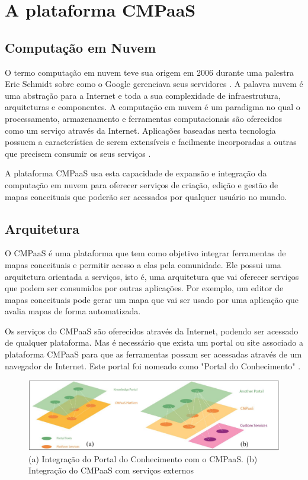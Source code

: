 \documentclass[
	12pt,				%
	openright,			%
	oneside,			%
	a4paper,			%
	english,			%
	french,				%
	spanish,			%
	brazil				%
	]{abntex2}
\begin{document}
\section{A plataforma CMPaaS}

\subsection{Computação em Nuvem}

O termo computação em nuvem teve sua origem em 2006 durante uma palestra Eric Schmidt sobre como o Google gerenciava seus servidores \cite{taurion2009}. A palavra nuvem é uma abstração para a Internet e toda a sua complexidade de infraestrutura, arquiteturas e componentes. A computação em nuvem é um paradigma no qual o processamento, armazenamento e ferramentas computacionais são oferecidos como um serviço através da Internet. Aplicações baseadas nesta tecnologia possuem a característica de serem extensíveis e facilmente incorporadas a outras que precisem consumir os seus serviços \cite{Perin2014}.

A plataforma CMPaaS usa esta capacidade de expansão e integração da computação em nuvem para oferecer serviços de criação, edição e gestão de mapas conceituais que poderão ser acessados por qualquer usuário no mundo.

\subsection{Arquitetura}

O CMPaaS é uma plataforma que tem como objetivo integrar ferramentas de mapas conceituais e permitir acesso a elas pela comunidade. Ele possui uma arquitetura orientada a serviços, isto é, uma arquitetura que vai oferecer serviços que podem ser consumidos por outras aplicações. Por exemplo, um editor de mapas conceituais pode gerar um mapa que vai ser usado por uma aplicação que avalia mapas de forma automatizada.

Os serviços do CMPaaS são oferecidos através da Internet, podendo ser acessado de qualquer plataforma. Mas é necessário que exista um portal ou site associado a plataforma CMPaaS para que as ferramentas possam ser acessadas através de um navegador de Internet. Este portal foi nomeado como "Portal do Conhecimento" \cite{Perin2014}. 


\begin{figure}[htb]
	\caption{\label{fig_cmpaas}(a) Integração do Portal do Conhecimento com o CMPaaS. (b) Integração do CMPaaS com serviços externos}
	\begin{center}
		\includegraphics[scale=0.3]{cmpaas.png}
	\end{center}
\end{figure}
\end{document}
